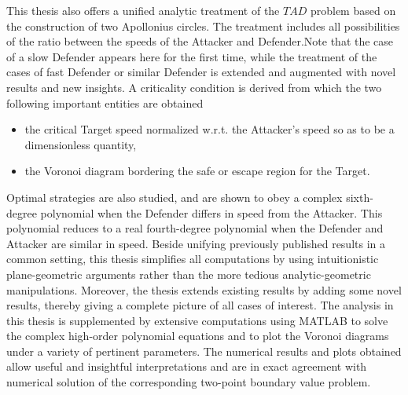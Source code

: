 This thesis also offers a unified analytic treatment of the $TAD$ problem based on the construction of two Apollonius circles.
The treatment includes all possibilities of the ratio between the speeds of the Attacker and Defender.Note that the case of a slow Defender appears here for the first time, while the treatment of the cases of fast Defender or similar Defender is extended and augmented with novel results and new insights. A criticality condition is derived from which the two following important entities are obtained
\begin{itemize}
\item the critical Target speed normalized w.r.t. the Attacker's speed so as to be a dimensionless quantity,
\item the Voronoi diagram bordering the safe or escape region for the Target.
\end{itemize}

Optimal strategies are also studied, and are shown to obey a complex sixth-degree polynomial when the Defender differs in speed from the Attacker. This polynomial reduces to a real fourth-degree polynomial when the Defender and Attacker are similar in speed.
Beside unifying previously published results in a common setting, this thesis simplifies all computations by using intuitionistic plane-geometric arguments rather than the more tedious analytic-geometric manipulations. 
Moreover, the thesis extends existing results by adding some novel results, thereby giving a complete picture of all cases of interest.
The analysis in this thesis is supplemented by extensive computations using MATLAB to solve the complex high-order polynomial equations and to plot the Voronoi diagrams under a variety of pertinent parameters. The numerical results and plots obtained allow useful and insightful interpretations and are in exact agreement with numerical solution of the corresponding two-point boundary value problem.

\bigskip 

